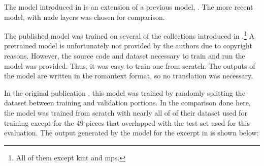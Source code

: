 
The model introduced in \textcite{micchi2021deep} is an
extension of a previous model, \textcite{micchi2020not}. The
more recent model, with \gls{nade} layers was chosen for
comparison.

The published model was trained on several of the
collections introduced in
.\footnote{All of
them except \gls{kmt} and \gls{mps}.} A pretrained model is
unfortunately not provided by the authors due to copyright
reasons. However, the source code and dataset necessary to
train and run the model was provided. Thus, it was easy to
train one from scratch. The outputs of the model are written
in the \gls{romantext} format, so no translation was
necessary. 

In the original publication \parencite{micchi2021deep}, this
model was trained by randomly splitting the dataset between
training and validation portions. In the comparison done
here, the model was trained from scratch with nearly all of
of their dataset used for training except for the 49 pieces
that overlapped with the test set used for this evaluation.
The output generated by the model for the excerpt in
 is shown below:

